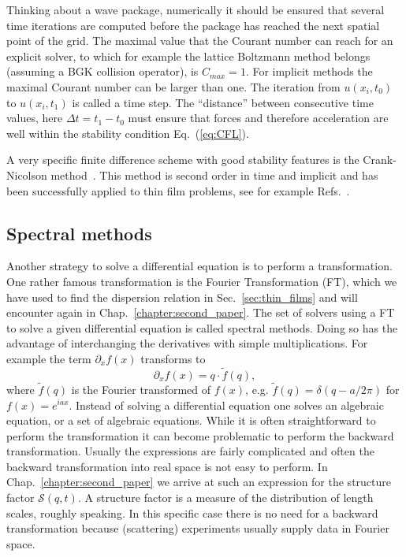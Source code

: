 Thinking about a wave package, numerically it should be ensured that several time iterations are computed before the package has reached the next spatial point of the grid.
The maximal value that the Courant number can reach for an explicit solver, to which for example the lattice Boltzmann method belongs (assuming a BGK collision operator), is $C_{max} = 1$.
For implicit methods the maximal Courant number can be larger than one.
The iteration from $u(x_i,t_0)$ to $u(x_i,t_1)$ is called a time step. 
The ``distance'' between consecutive time values, here $\Delta t = t_1 - t_0$ must ensure that forces and therefore acceleration are well within the stability condition Eq.~(\ref{eq:CFL}).

A very specific finite difference scheme with good stability features is the Crank-Nicolson method~\cite{crankPracticalMethodNumerical1947, pressNumericalRecipes3rd2007}.
This method is second order in time and implicit and has been successfully applied to thin film problems, see for example Refs.~\cite{diezGlobalModelsMoving2000, diezMetallicthinfilmInstabilitySpatially2016, munchDewettingRatesThin2005}.

\subsection{Spectral methods}
Another strategy to solve a differential equation is to perform a transformation.
One rather famous transformation is the Fourier Transformation (FT), which we have used to find the dispersion relation in Sec.~\ref{sec:thin_films} and will encounter again in Chap.~\ref{chapter:second_paper}.
The set of solvers using a FT to solve a given differential equation is called spectral methods.
Doing so has the advantage of interchanging the derivatives with simple multiplications.
For example the term $\partial_x f(x)$ transforms to  
\begin{equation}\label{eq:fourier_transform}
    \partial_x f(x) = q\cdot \tilde{f}(q),
\end{equation}
where $\tilde{f}(q)$ is the Fourier transformed of $f(x)$, e.g. $\tilde{f}(q) = \delta(q - a/2\pi)$ for $f(x) = e^{iax}$. 
Instead of solving a differential equation one solves an algebraic equation, or a set of algebraic equations.
While it is often straightforward to perform the transformation it can become problematic to perform the backward transformation. 
Usually the expressions are fairly complicated and often the backward transformation into real space is not easy to perform.
In Chap.~\ref{chapter:second_paper} we arrive at such an expression for the structure factor $\mathcal{S}(q, t)$.
A structure factor is a measure of the distribution of length scales, roughly speaking.
In this specific case there is no need for a backward transformation because (scattering) experiments usually supply data in Fourier space.

